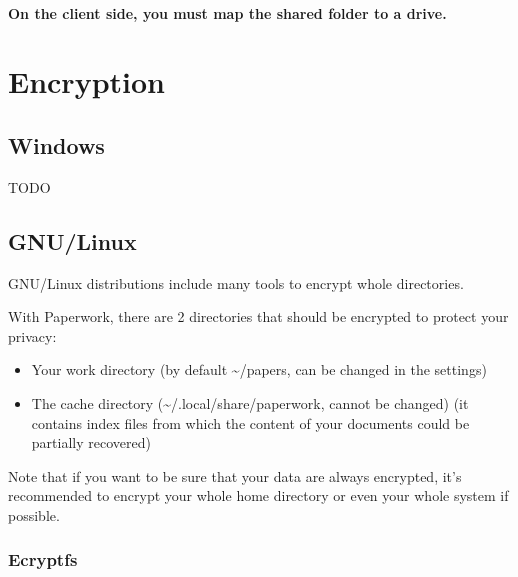 \documentclass[10pt,a4paper]{article}
\begin{document}
\paragraph{On the client side, you must map the shared folder to a drive.}

%
%
%

\section{Encryption}

\subsection{Windows}

TODO


\subsection{GNU/Linux}

GNU/Linux distributions include many tools to encrypt whole directories.

With Paperwork, there are 2 directories that should be encrypted to
protect your privacy:
\begin{itemize}
\item Your work directory (by default \textasciitilde /papers, can be changed
in the settings)
\item The cache directory (\textasciitilde /.local/share/paperwork, cannot
be changed) (it contains index files from which the content of your
documents could be partially recovered)
\end{itemize}

Note that if you want to be sure that your data are always encrypted,
it's recommended to encrypt your whole home directory or even your whole system
if possible.

\subsubsection{Ecryptfs}
\end{document}
